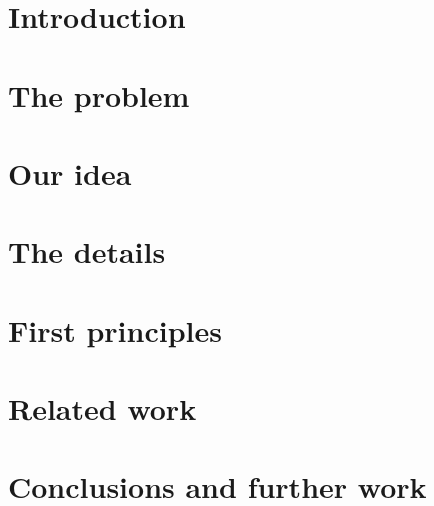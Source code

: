 \section{Introduction}


\section{The problem}


\section{Our idea}


\section{The details}


\section{First principles}
\label{principles}


\section{Related work}
\label{ch:related}


\section{Conclusions and further work}


